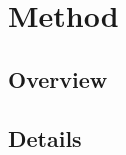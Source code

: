 \chapter{Method}
\label{ch:method}

\section{Overview}
\lipsum[25-32]

\section{Details}
\lipsum[33-40]
